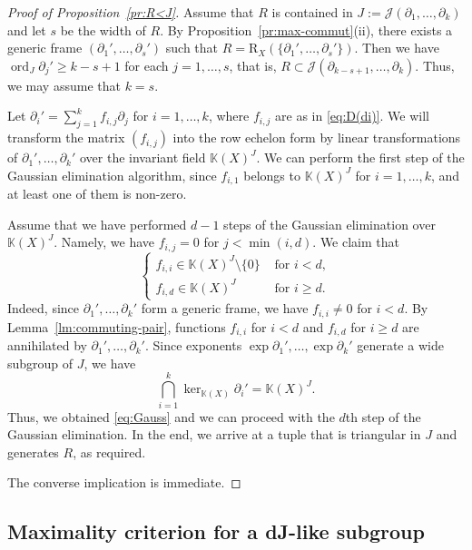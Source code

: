 \documentclass[12pt,a4paper]{amsart}
\theoremstyle{plain}
\theoremstyle{definition}
\theoremstyle{remark}
\def\ord{\operatorname{ord}}
\def\K{{\mathbb K}}
\def\J{{\mathcal J}}
\begin{document}
\begin{proof}[Proof of Proposition~\ref{pr:R<J}]
   Assume that $R$ is contained in $J:=\J(\partial_1,\ldots,\partial_k)$ and let $s$ be the width of $R$.
   By Proposition~\ref{pr:max-commut}(ii), there exists a generic frame $(\partial_1',\ldots,\partial_s')$ such that $R=\mathrm{R}_X(\{\partial_1',\ldots,\partial_s'\})$.
   Then we have $\ord_J\partial_j'\ge k-s+1$ for each $j=1,\ldots,s$, that is, $R\subset \J(\partial_{k-s+1},\ldots,\partial_k)$. 
    Thus, we may assume that $k=s$.
   
   Let $\partial_i'=\sum_{j=1}^k f_{i,j}\partial_j$ for $i=1,\ldots,k$, where $f_{i,j}$ are as in \eqref{eq:D(di)}.
   We will transform the matrix $(f_{i,j})$ into the row echelon form by linear transformations of $\partial_1',\ldots,\partial_k'$ over the invariant field $\K(X)^J$.
   We can perform the first step of the Gaussian elimination algorithm, since $f_{i,1}$ belongs to $\K(X)^J$ for $i=1,\ldots,k$, and at least one of them is non-zero.
   
   Assume that we have performed $d-1$ steps of the Gaussian elimination over $\K(X)^J$. Namely, we have $f_{i,j}=0$ for $j<\min(i,d)$.
   We claim that
   \begin{equation}\label{eq:Gauss}
      \begin{cases}
         f_{i,i}\in \K(X)^J\setminus\{0\}&\text{ for }i<d, \\
         f_{i,d}\in \K(X)^J &\text{ for } i\ge d.
      \end{cases}
   \end{equation}
      Indeed, since $\partial_1',\ldots,\partial_k'$ form a generic frame, we have $f_{i,i}\neq0$ for $i<d$.
   By Lemma~\ref{lm:commuting-pair}, functions $f_{i,i}$ for $i<d$ and $f_{i,d}$ for $i\ge d$ are annihilated by $\partial_1',\ldots,\partial_k'$.
   Since exponents $\exp\partial_1',\ldots, \exp\partial_k'$ generate a wide subgroup of $J$, we have \[\bigcap_{i=1}^k \ker_{\K(X)}\partial_i'=\K(X)^J.\]
   Thus, we obtained \eqref{eq:Gauss} and we can proceed with the $d$th step of the Gaussian elimination.
   In the end, we arrive at a tuple that is triangular in $J$ and generates $R$, as required.

   The converse implication is immediate.
\end{proof}

\subsection{Maximality criterion for a dJ-like subgroup}
\end{document}
